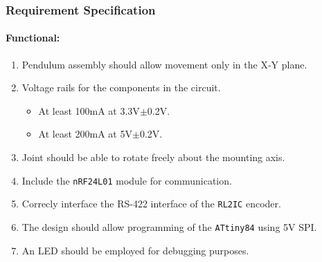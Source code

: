 \subsubsection{Requirement Specification}
\label{subs:joint_requirements}

\paragraph{Functional:}
\begin{enumerate}[resume]
	\item Pendulum assembly should allow movement only in the X-Y plane. 
	\label{enum:pendulum_should_only_x_y}
	\item Voltage rails for the components in the circuit.
	\label{enum:joint_voltage_rails}
	\begin{itemize}
		\item At least 100mA at 3.3V$\pm$0.2V.
		\item At least 200mA at 5V$\pm$0.2V.
	\end{itemize}
	\item Joint should be able to rotate freely about the mounting axis.
	\label{enum:rotate_freely_joint}
	\item Include the \texttt{nRF24L01} module for communication.
	\label{enum:joint_include_nrf}
	\item Correcly interface the RS-422 interface of the \texttt{RL2IC} encoder.
	\label{enum:interface_rs422_enc}
	\item The design should allow programming of the \texttt{ATtiny84} using 5V SPI.
	\label{enum:program_5v_spi}
	\item An LED should be employed for debugging purposes.
	\label{enum:led_debugging_joint}
\end{enumerate}

